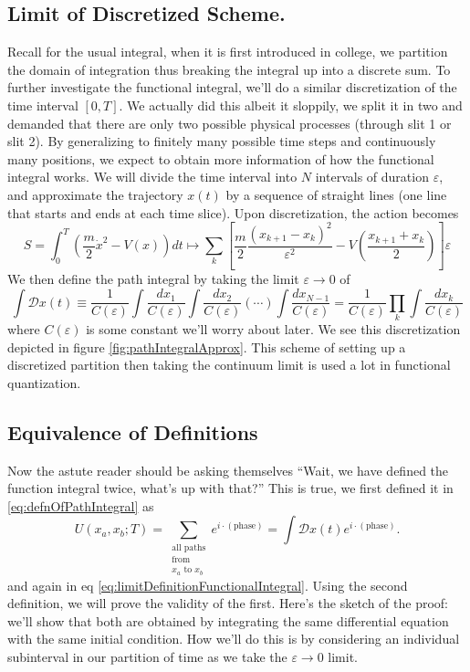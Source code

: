 \subsection{Limit of Discretized Scheme.}
Recall for the usual integral, when it is first introduced in
college, we partition the domain of integration thus breaking the
integral up into a discrete sum. To further investigate the
functional integral, we'll do a similar discretization of the
time interval $[0,T]$. We actually did this albeit it sloppily,
we split it in two and demanded that there are only two possible
physical processes (through slit 1 or slit 2). By generalizing to
finitely many possible time steps and continuously many
positions, we expect to obtain more information of how the
functional integral works. We will divide the time interval into
$N$ intervals of duration $\varepsilon$, and approximate the
trajectory $x(t)$ by a sequence of straight lines (one line that
starts and ends at each time slice). Upon discretization, the
action becomes
\begin{equation}%
S=\int^{T}_{0}\left(\frac{m}{2}\dot{x}^{2}-V(x)\right)dt\mapsto\sum_{k}\left[\frac{m}{2}\frac{(x_{k+1}-x_{k})^{2}}{\varepsilon^{2}}-V\left(\frac{x_{k+1}+x_{k}}{2}\right)\right]\varepsilon
\end{equation}
We then define the path integral by taking the limit
$\varepsilon\to0$ of
\begin{equation}\label{eq:limitDefinitionFunctionalIntegral}
\int\mathcal{D}x(t)\equiv\frac{1}{C(\varepsilon)}\int\frac{dx_{1}}{C(\varepsilon)}\int\frac{dx_{2}}{C(\varepsilon)}(\cdots)\int\frac{dx_{N-1}}{C(\varepsilon)}=\frac{1}{C(\varepsilon)}\prod_{k}\int\frac{dx_{k}}{C(\varepsilon)}
\end{equation}
where $C(\varepsilon)$ is some constant we'll worry about
later. We see this discretization depicted in figure
\ref{fig:pathIntegralApprox}. This scheme of setting up a
discretized partition then taking the continuum limit is used a
lot in functional quantization.



\subsection{Equivalence of Definitions}
Now the astute reader should be asking themselves ``Wait, we have
defined the function integral twice, what's up with that?'' This
is true, we first defined it in \eqref{eq:defnOfPathIntegral} as
\begin{equation*}
U(x_a,x_b;T) = \sum_{\substack{
\text{all paths}\\
\text{from}\\
\text{$x_a$ to $x_b$}
}} e^{i\cdot(\text{phase})}
= \int\mathcal{D}x(t) e^{i\cdot(\text{phase})}.
\end{equation*}
and again in eq
\eqref{eq:limitDefinitionFunctionalIntegral}. Using the second
definition, we will prove the validity of the first. Here's the
sketch of the proof: we'll show that both are obtained by
integrating the same differential equation with the same initial
condition. How we'll do this is by considering an individual
subinterval in our partition of time as we take the
$\varepsilon\to0$ limit. 

